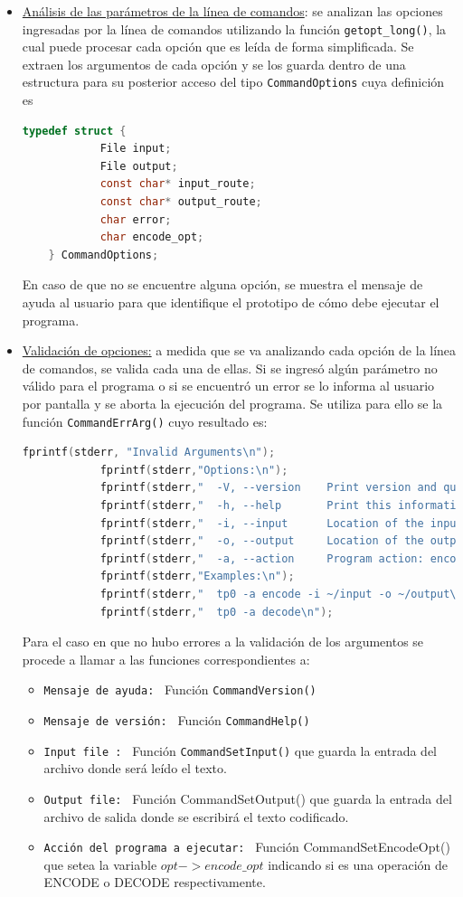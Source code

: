 \documentclass[11pt,a4paper]{article}
\begin{document}
\begin{itemize}
	\item \underline{Análisis de las parámetros de la línea de comandos}: se analizan las opciones ingresadas por la línea de comandos utilizando la función \texttt{getopt\_long()}, la cual puede procesar cada opción que es leída de forma simplificada. Se extraen los argumentos de cada opción y se los guarda dentro de una estructura para su posterior acceso del tipo \texttt{CommandOptions} cuya definición es
	\begin{lstlisting}[language=C]
	typedef struct {
    		File input;
    		File output;
    		const char* input_route;
    		const char* output_route;
    		char error;
    		char encode_opt;
	} CommandOptions;
	\end{lstlisting}
En caso de que no se encuentre alguna opción, se muestra el mensaje de ayuda al usuario para que identifique el prototipo de cómo debe ejecutar el programa.
	
	\item \underline{Validación de opciones:} a medida que se va analizando cada opción de la línea de comandos, se valida cada una de ellas. Si se ingresó algún parámetro no válido para el programa o si se encuentró un error se lo informa al usuario por pantalla y se aborta la ejecución del programa. Se utiliza para ello se la función \texttt{CommandErrArg()} cuyo resultado es:
	\begin{lstlisting}[language=C]
		fprintf(stderr, "Invalid Arguments\n");
    		fprintf(stderr,"Options:\n");
    		fprintf(stderr,"  -V, --version    Print version and quit.\n");
    		fprintf(stderr,"  -h, --help       Print this information.\n");
    		fprintf(stderr,"  -i, --input      Location of the input file.\n");
    		fprintf(stderr,"  -o, --output     Location of the output file.\n");
    		fprintf(stderr,"  -a, --action     Program action: encode (default) or decode.\n");
    		fprintf(stderr,"Examples:\n");
    		fprintf(stderr,"  tp0 -a encode -i ~/input -o ~/output\n");
    		fprintf(stderr,"  tp0 -a decode\n");
	\end{lstlisting}

	Para el caso en que no hubo errores a la validación de los argumentos se procede a llamar a las funciones correspondientes a:
	\begin{itemize}
		\item \texttt{Mensaje de ayuda: } Función \texttt{CommandVersion()}
		\item \texttt{Mensaje de versión: } Función \texttt{CommandHelp()}
		\item \texttt{Input file : } Función \texttt{CommandSetInput()} que guarda la entrada del archivo donde será leído el texto. 
		\item \texttt{Output file: } Función {CommandSetOutput()} que guarda la entrada del archivo de salida donde se escribirá el texto codificado.
		\item \texttt{Acción del programa a ejecutar: } Función {CommandSetEncodeOpt()} que setea la variable $opt->encode\_opt$ indicando si es una operación de ENCODE o DECODE respectivamente.
\end{itemize}


\end{itemize}
\end{document}
